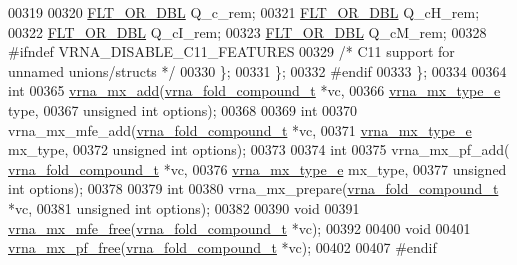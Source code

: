\begin{DoxyCode}
00319 
00320       \hyperlink{group__data__structures_ga31125aeace516926bf7f251f759b6126}{FLT\_OR\_DBL}      Q\_c\_rem;
00321       \hyperlink{group__data__structures_ga31125aeace516926bf7f251f759b6126}{FLT\_OR\_DBL}      Q\_cH\_rem;
00322       \hyperlink{group__data__structures_ga31125aeace516926bf7f251f759b6126}{FLT\_OR\_DBL}      Q\_cI\_rem;
00323       \hyperlink{group__data__structures_ga31125aeace516926bf7f251f759b6126}{FLT\_OR\_DBL}      Q\_cM\_rem;
00328 \textcolor{preprocessor}{#ifndef VRNA\_DISABLE\_C11\_FEATURES}
00329     \textcolor{comment}{/* C11 support for unnamed unions/structs */}
00330     \};
00331   \};
00332 \textcolor{preprocessor}{#endif}
00333 \};
00334 
00364 \textcolor{keywordtype}{int}
00365 \hyperlink{group__dp__matrices_ga08661f098008961dab0023bf300f0c33}{vrna\_mx\_add}(\hyperlink{group__fold__compound_structvrna__fc__s}{vrna\_fold\_compound\_t} *vc,
00366             \hyperlink{group__dp__matrices_ga6042ea1d58d01931e959791be6d89343}{vrna\_mx\_type\_e} type,
00367             \textcolor{keywordtype}{unsigned} \textcolor{keywordtype}{int} options);
00368 
00369 \textcolor{keywordtype}{int}
00370 vrna\_mx\_mfe\_add(\hyperlink{group__fold__compound_structvrna__fc__s}{vrna\_fold\_compound\_t} *vc,
00371                 \hyperlink{group__dp__matrices_ga6042ea1d58d01931e959791be6d89343}{vrna\_mx\_type\_e} mx\_type,
00372                 \textcolor{keywordtype}{unsigned} \textcolor{keywordtype}{int} options);
00373 
00374 \textcolor{keywordtype}{int}
00375 vrna\_mx\_pf\_add( \hyperlink{group__fold__compound_structvrna__fc__s}{vrna\_fold\_compound\_t} *vc,
00376                 \hyperlink{group__dp__matrices_ga6042ea1d58d01931e959791be6d89343}{vrna\_mx\_type\_e} mx\_type,
00377                 \textcolor{keywordtype}{unsigned} \textcolor{keywordtype}{int} options);
00378 
00379 \textcolor{keywordtype}{int}
00380 vrna\_mx\_prepare(\hyperlink{group__fold__compound_structvrna__fc__s}{vrna\_fold\_compound\_t} *vc,
00381                 \textcolor{keywordtype}{unsigned} \textcolor{keywordtype}{int} options);
00382 
00390 \textcolor{keywordtype}{void}
00391 \hyperlink{group__dp__matrices_ga6a9422feb5dfe5c64050cebf447672d0}{vrna\_mx\_mfe\_free}(\hyperlink{group__fold__compound_structvrna__fc__s}{vrna\_fold\_compound\_t} *vc);
00392 
00400 \textcolor{keywordtype}{void}
00401 \hyperlink{group__dp__matrices_ga2283e69fd139fb8e58d7ade3b5773f9c}{vrna\_mx\_pf\_free}(\hyperlink{group__fold__compound_structvrna__fc__s}{vrna\_fold\_compound\_t} *vc);
00402 
00407 \textcolor{preprocessor}{#endif}
\end{DoxyCode}
